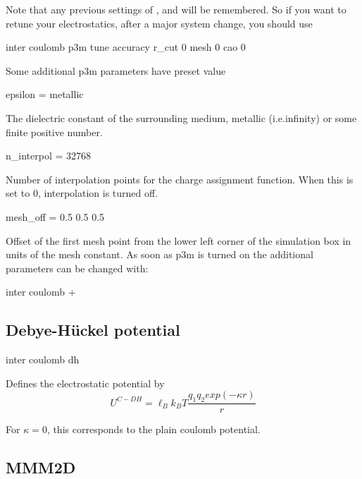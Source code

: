 Note that any previous settings of ,  and
 will be remembered. So if you want to retune your
electrostatics, \eg after a major system change, you should use
\begin{code}
inter coulomb  p3m tune accuracy  r_cut 0 mesh 0 cao 0
\end{code}

Some additional p3m parameters have preset value
\begin{tclcode}
 epsilon = metallic
\end{tclcode}
The dielectric constant of the surrounding medium, metallic
(i.e.infinity) or some finite positive number.
\begin{tclcode}
 n_interpol = 32768
\end{tclcode}
Number of interpolation points for the charge assignment function.
When this is set to 0, interpolation is turned off.
\begin{tclcode}
 mesh_off = 0.5 0.5 0.5
\end{tclcode}
Offset of the first mesh point from the lower left corner of the
simulation box in units of the mesh constant. As soon as p3m is turned
on the additional parameters can be changed with:
\begin{code}
inter coulomb  +
\end{code}


\subsection{Debye-H\"uckel potential}

\begin{essyntax}
  inter coulomb dh \var{\kappa} 
\end{essyntax}

Defines the electrostatic potential by
\begin{equation}
  U^{C-DH} = \ell_B k_B T \frac{q_1 q_2 exp(-\kappa r)}{r}
\end{equation}

For $\kappa = 0$, this corresponds to the plain coulomb potential.

\subsection{MMM2D}

